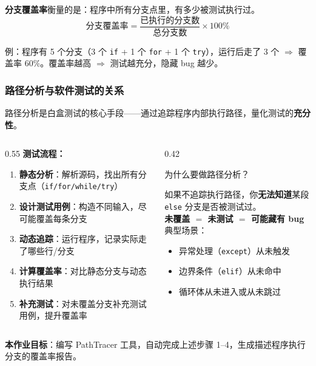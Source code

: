 \documentclass[presentation,aspectratio=169]{ctexbeamer}
\begin{document}
\begin{frame}[fragile]
\vspace{0.15cm}
{\small\textbf{分支覆盖率}衡量的是：程序中所有分支点里，有多少被测试执行过。}
\[
\text{分支覆盖率} = \frac{\text{已执行的分支数}}{\text{总分支数}} \times 100\%
\]

{\small 例：程序有 5 个分支（3 个 \texttt{if} + 1 个 \texttt{for} + 1 个 \texttt{try}），运行后走了 3 个 $\Rightarrow$ 覆盖率 $60\%$。覆盖率越高 $\Rightarrow$ 测试越充分，隐藏 bug 越少。}
\end{frame}


\begin{frame}
\frametitle{路径分析与软件测试的关系}
{\small 路径分析是白盒测试的核心手段——通过追踪程序内部执行路径，量化测试的\textbf{充分性}。}

\vspace{0.15cm}
\begin{columns}[T]
\begin{column}{0.55\textwidth}
{\small\textbf{测试流程：}}
\begin{enumerate}\setlength{\itemsep}{1pt}
    \item \textbf{静态分析}：解析源码，找出所有分支点（\texttt{if/for/while/try}）
    \item \textbf{设计测试用例}：构造不同输入，尽可能覆盖每条分支
    \item \textbf{动态追踪}：运行程序，记录实际走了哪些行/分支
    \item \textbf{计算覆盖率}：对比静态分支与动态执行结果
    \item \textbf{补充测试}：对未覆盖分支补充测试用例，提升覆盖率
\end{enumerate}
\end{column}
\begin{column}{0.42\textwidth}
\begin{alertblock}{\small 为什么要做路径分析？}
{\scriptsize
如果不追踪执行路径，你\textbf{无法知道}某段 \texttt{else} 分支是否被测试过。\\[3pt]
\textbf{未覆盖 $=$ 未测试 $=$ 可能藏有 bug}\\[3pt]
典型场景：
\begin{itemize}\setlength{\itemsep}{0pt}
    \item 异常处理（\texttt{except}）从未触发
    \item 边界条件（\texttt{elif}）从未命中
    \item 循环体从未进入或从未跳过
\end{itemize}}
\end{alertblock}
\end{column}
\end{columns}

\vspace{0.15cm}
{\small\textbf{本作业目标}：编写 PathTracer 工具，自动完成上述步骤 1–4，生成描述程序执行分支的覆盖率报告。}
\end{frame}
\end{document}

